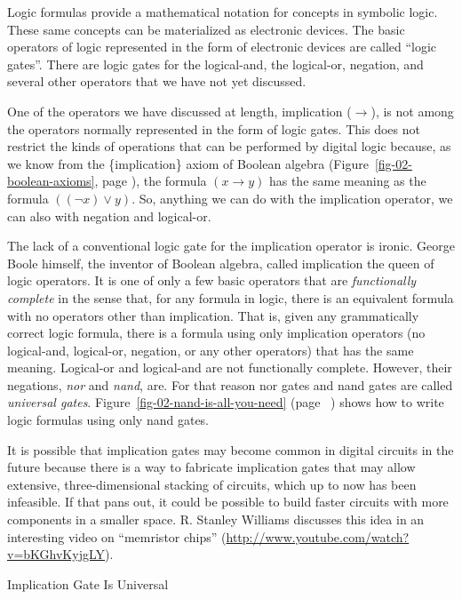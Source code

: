 Logic formulas provide a mathematical notation for concepts in symbolic logic.
These same concepts can be materialized as electronic devices.
The basic operators of logic represented in the form of electronic devices
are called ``logic gates''.
There are logic 
gates
for the logical-and, the logical-or, negation, and
several other operators that we have not yet discussed.

\begin{aside}
One of the operators we have discussed at length, implication
($\rightarrow$), is not among the operators normally represented
in the form of logic gates. This does not restrict the kinds of
operations that can be performed by digital logic because,
as we know from the \{implication\} axiom of Boolean algebra
(Figure~\ref{fig-02-boolean-axioms}, page \pageref{fig-02-boolean-axioms}),
the formula $(x \rightarrow y)$ has the same meaning as the
formula $((\neg x) \vee y)$. So, anything we can do with
the implication operator, we can also with
negation and logical-or.

The lack of a conventional logic gate for the implication operator
is ironic.
George Boole himself, the inventor of Boolean algebra,
called implication the queen of logic operators.
It is one of only a few basic operators
that are \emph{functionally complete} in the sense that,
for any formula in logic, there is an equivalent formula
with no operators other than implication.
That is, given any grammatically correct logic formula,
there is a formula using only
implication operators (no logical-and, logical-or,
negation, or any other operators)
that has the same meaning.
Logical-or and logical-and are not functionally complete.
However, their negations, \emph{nor} and \emph{nand}, are.
For that reason nor gates and nand gates
are called \emph{universal gates}.
Figure~\ref{fig-02-nand-is-all-you-need} (page ~\pageref{fig-02-nand-is-all-you-need})
shows how to write logic formulas using only nand gates.

It is possible that implication gates may
become common in digital circuits in the future
because there is a way to fabricate implication gates that may allow extensive,
three-dimensional stacking of circuits, which up to now has been infeasible.
If that pans out, it could be possible to build
faster circuits with more components in a smaller space.
R. Stanley Williams discusses this
idea in an interesting video on ``memristor chips''
(\url{http://www.youtube.com/watch?v=bKGhvKyjgLY}).
\caption{Implication Gate Is Universal}
\label{no-implication-gate}
\end{aside}

